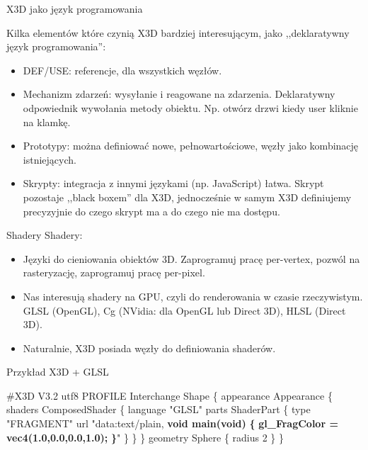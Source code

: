 \documentclass{beamer}
\begin{document}
\begin{frame}{X3D jako język programowania}

Kilka elementów które czynią X3D bardziej interesującym,
jako ,,deklaratywny język programowania'':

\begin{itemize}
  \item DEF/USE: referencje, dla wszystkich węzłów.
  \item Mechanizm zdarzeń: wysyłanie i reagowane na zdarzenia.
    Deklaratywny odpowiednik wywołania metody obiektu.
    Np. otwórz drzwi kiedy user kliknie na klamkę.
  \item Prototypy: można definiować nowe, pełnowartościowe,
    węzły jako kombinację istniejących.
  \item Skrypty: integracja z innymi językami (np. JavaScript) łatwa.
    Skrypt pozostaje ,,black boxem'' dla X3D, jednocześnie w samym
    X3D definiujemy precyzyjnie do czego skrypt ma a do czego nie ma dostępu.
\end{itemize}
\end{frame}

\begin{frame}{Shadery}
Shadery:
\begin{itemize}
  \item Języki do cieniowania obiektów 3D. Zaprogramuj pracę per-vertex,
    pozwól na rasteryzację, zaprogramuj pracę per-pixel.
  \item Nas interesują shadery na GPU, czyli do renderowania w czasie
    rzeczywistym. GLSL (OpenGL), Cg (NVidia: dla OpenGL lub Direct 3D),
    HLSL (Direct 3D).
  \item Naturalnie, X3D posiada węzły do definiowania shaderów.
\end{itemize}
\end{frame}

\begin{frame}[fragile]
\begin{exampleblock}{Przykład X3D + GLSL}
\begin{semiverbatim}
\#X3D V3.2 utf8
PROFILE Interchange
Shape \{
  appearance Appearance \{
    shaders ComposedShader \{
      language "GLSL"
      parts ShaderPart \{
        type "FRAGMENT"
        url "data:text/plain,
        \textbf{void main(void)}
        \textbf{\{}
          \textbf{gl\_FragColor = vec4(1.0,0.0,0.0,1.0);}
        \textbf{\}}" \} \} \}
  geometry Sphere \{ radius 2 \}
\}
\end{semiverbatim}
\end{exampleblock}
\end{frame}
\end{document}
